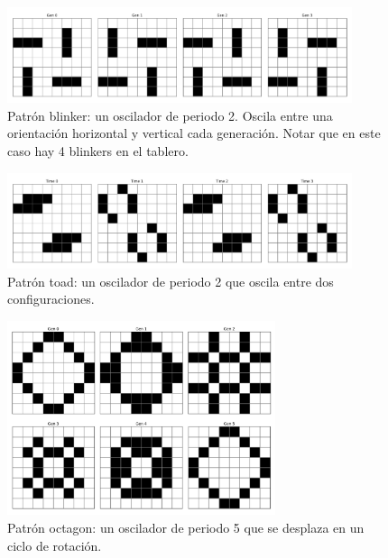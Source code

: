 \documentclass[]{article}
\begin{document}
\begin{figure}[H]
  \centering
  \includegraphics[width=0.9\textwidth]{../assets/oscillator/blinker/blinker.png}
  \caption{Patrón blinker: un oscilador de periodo 2. Oscila entre una orientación horizontal y vertical cada generación. Notar que en este caso hay 4 blinkers en el tablero.}
  \label{fig:blinker}
\end{figure}

\begin{figure}[H]
  \centering
  \includegraphics[width=0.9\textwidth]{../assets/oscillator/toad/toad.png}
  \caption{Patrón toad: un oscilador de periodo 2 que oscila entre dos configuraciones.}
  \label{fig:toad}
\end{figure}

\begin{figure}[H]
  \centering
  \includegraphics[width=0.7\textwidth]{../assets/oscillator/octagon_2/octagon_2.png}
  \caption{Patrón octagon: un oscilador de periodo 5 que se desplaza en un ciclo de rotación.}
  \label{fig:octagon}
\end{figure}
\end{document}
